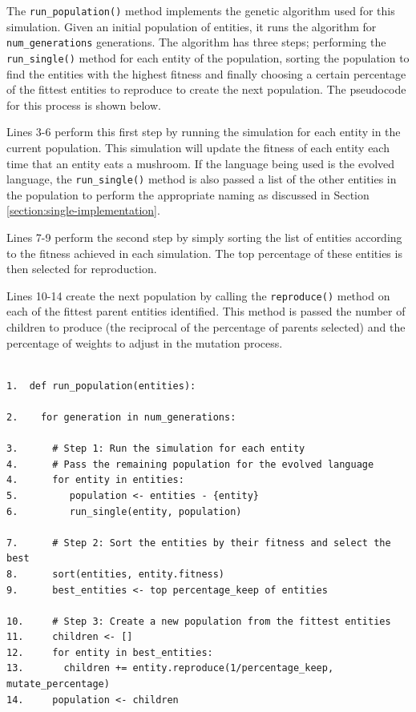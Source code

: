 \documentclass[12pt,a4paper,twoside,openright]{report}
\begin{document}
The \texttt{run\_population()} method implements the genetic algorithm used for this simulation. Given an initial population of entities, it runs the algorithm for \texttt{num\_generations} generations. The algorithm has three steps; performing the \texttt{run\_single()} method for each entity of the population, sorting the population to find the entities with the highest fitness and finally choosing a certain percentage of the fittest entities to reproduce to create the next population. The pseudocode for this process is shown below.

Lines 3-6 perform this first step by running the simulation for each entity in the current population. This simulation will update the fitness of each entity each time that an entity eats a mushroom. If the language being used is the evolved language, the \texttt{run\_single()} method is also passed a list of the other entities in the population to perform the appropriate naming as discussed in Section \ref{section:single-implementation}.

Lines 7-9 perform the second step by simply sorting the list of entities according to the fitness achieved in each simulation. The top percentage of these entities is then selected for reproduction.

Lines 10-14 create the next population by calling the \texttt{reproduce()} method on each of the fittest parent entities identified. This method is passed the number of children to produce (the reciprocal of the percentage of parents selected) and the percentage of weights to adjust in the mutation process.

\begin{verbatim}

1.  def run_population(entities):

2.    for generation in num_generations:

3.      # Step 1: Run the simulation for each entity
4.      # Pass the remaining population for the evolved language
4.      for entity in entities:
5.         population <- entities - {entity}
6.         run_single(entity, population)
           
7.      # Step 2: Sort the entities by their fitness and select the best
8.      sort(entities, entity.fitness)
9.      best_entities <- top percentage_keep of entities

10.     # Step 3: Create a new population from the fittest entities
11.     children <- []
12.     for entity in best_entities:
13.       children += entity.reproduce(1/percentage_keep, mutate_percentage)
14.     population <- children

\end{verbatim}
\end{document}
